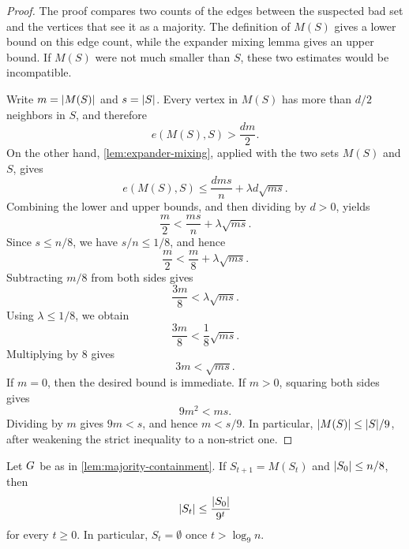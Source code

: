 \begin{proof}
	The proof compares two counts of the edges between the suspected bad set and the vertices that see it as a majority. The definition of \(M(S)\) gives a lower bound on this edge count, while the expander mixing lemma gives an upper bound. If \(M(S)\) were not much smaller than \(S\), these two estimates would be incompatible.

	Write \(m=\lvert M(S)\rvert\) and \(s=\lvert S\rvert\). Every vertex in \(M(S)\) has more than \(d/2\) neighbors in \(S\), and therefore
	\begin{equation}
		e(M(S),S)>\frac{dm}{2}.
	\end{equation}
	On the other hand, \cref{lem:expander-mixing}, applied with the two sets \(M(S)\) and \(S\), gives
	\begin{equation}
		e(M(S),S)\leq \frac{dms}{n}+\lambda d\sqrt{ms}.
	\end{equation}
	Combining the lower and upper bounds, and then dividing by \(d>0\), yields
	\begin{equation}
		\frac{m}{2}<\frac{ms}{n}+\lambda\sqrt{ms}.
	\end{equation}
	Since \(s\leq n/8\), we have \(s/n\leq 1/8\), and hence
	\begin{equation}
		\frac{m}{2}<\frac{m}{8}+\lambda\sqrt{ms}.
	\end{equation}
	Subtracting \(m/8\) from both sides gives
	\begin{equation}
		\frac{3m}{8}<\lambda\sqrt{ms}.
	\end{equation}
	Using \(\lambda\leq 1/8\), we obtain
	\begin{equation}
		\frac{3m}{8}<\frac{1}{8}\sqrt{ms}.
	\end{equation}
	Multiplying by \(8\) gives
	\begin{equation}
		3m<\sqrt{ms}.
	\end{equation}
	If \(m=0\), then the desired bound is immediate. If \(m>0\), squaring both sides gives
	\begin{equation}
		9m^2<ms.
	\end{equation}
	Dividing by \(m\) gives \(9m<s\), and hence \(m<s/9\). In particular, \(\lvert M(S)\rvert\leq \lvert S\rvert/9\), after weakening the strict inequality to a non-strict one.
\end{proof}

\begin{corollary}
	\label{cor:majority-infection-decay}
	Let \(G\) be as in \cref{lem:majority-containment}. If \(S_{t+1}=M(S_t)\) and \(\lvert S_0\rvert\leq n/8\), then
	\begin{equation}
		\lvert S_t\rvert\leq \frac{\lvert S_0\rvert}{9^t}
	\end{equation}
	for every \(t\geq 0\). In particular, \(S_t=\emptyset\) once \(t>\log_9 n\).
\end{corollary}

